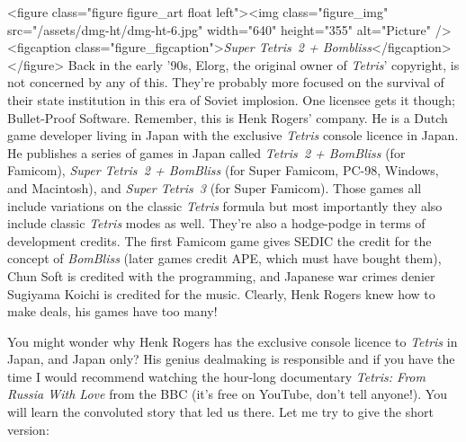 \documentclass{book}
\begin{document}
<figure class="figure figure_art float left"><img class="figure_img" src="/assets/dmg-ht/dmg-ht-6.jpg" width="640" height="355" alt="Picture" /><figcaption class="figure_figcaption">\emph{Super Tetris 2 + Bombliss}</figcaption></figure>
Back in the early ’90s, Elorg, the original owner of \emph{Tetris}’ copyright, is not concerned by any of this. They’re probably more focused on the survival of their state institution in this era of Soviet implosion. One licensee gets it though; Bullet-Proof Software. Remember, this is Henk Rogers’ company. He is a Dutch game developer living in Japan with the exclusive \emph{Tetris} console licence in Japan. He publishes a series of games in Japan called \emph{Tetris 2 + BomBliss} (for Famicom), \emph{Super Tetris 2 + BomBliss} (for Super Famicom, PC-98, Windows, and Macintosh), and \emph{Super Tetris 3} (for Super Famicom). Those games all include variations on the classic \emph{Tetris} formula but most importantly they also include classic \emph{Tetris} modes as well. They’re also a hodge-podge in terms of development credits. The first Famicom game gives SEDIC the credit for the concept of \emph{BomBliss} (later games credit APE, which must have bought them), Chun Soft is credited with the programming, and Japanese war crimes denier Sugiyama Koichi is credited for the music. Clearly, Henk Rogers knew how to make deals, his games have too many!

You might wonder why Henk Rogers has the exclusive console licence to \emph{Tetris} in Japan, and Japan only? His genius dealmaking is responsible and if you have the time I would recommend watching the hour-long documentary \emph{Tetris: From Russia With Love} from the BBC (it’s free on YouTube, don’t tell anyone!). You will learn the convoluted story that led us there. Let me try to give the short version:
\end{document}
